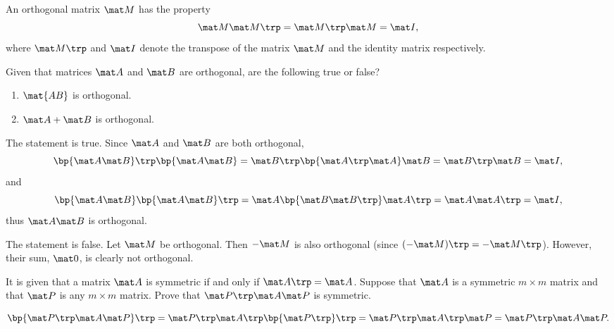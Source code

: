 \begin{problem}
    An orthogonal matrix $\mat M$ has the property \[\mat M \mat M \trp = \mat M \trp \mat M = \mat I,\] where $\mat M \trp$ and $\mat I$ denote the transpose of the matrix $\mat M$ and the identity matrix respectively.

    Given that matrices $\mat A$ and $\mat B$ are orthogonal, are the following true or false?
    \begin{enumerate}
        \item $\mat{AB}$ is orthogonal.
        \item $\mat A + \mat B$ is orthogonal.
    \end{enumerate}
\end{problem}
\clearpage
\begin{solution}
    \begin{ppart}
        The statement is true. Since $\mat A$ and $\mat B$ are both orthogonal, \[\bp{\mat A \mat B}\trp \bp{\mat A \mat B} = \mat B\trp \bp{\mat A \trp \mat A} \mat B = \mat B \trp \mat B = \mat I,\] and \[\bp{\mat A \mat B} \bp{\mat A \mat B}\trp = \mat A \bp{\mat B \mat B \trp} \mat A \trp = \mat A \mat A \trp = \mat I,\] thus $\mat A \mat B$ is orthogonal.
    \end{ppart}
    \begin{ppart}
        The statement is false. Let $\mat M$ be orthogonal. Then $-\mat M$ is also orthogonal (since $(-\mat M)\trp = -\mat M \trp$). However, their sum, $\mat 0$, is clearly not orthogonal.
    \end{ppart}
\end{solution}

\begin{problem}
    It is given that a matrix $\mat A$ is symmetric if and only if $\mat A \trp = \mat A$. Suppose that $\mat A$ is a symmetric $m \times m$ matrix and that $\mat P$ is any $m \times m$ matrix. Prove that $\mat P \trp \mat A \mat P$ is symmetric.
\end{problem}
\begin{solution}
    \[\bp{\mat P \trp \mat A \mat P}\trp = \mat P \trp \mat A \trp \bp{\mat P \trp}\trp = \mat P \trp \mat A \trp \mat P = \mat P \trp \mat A \mat P.\]
\end{solution}

